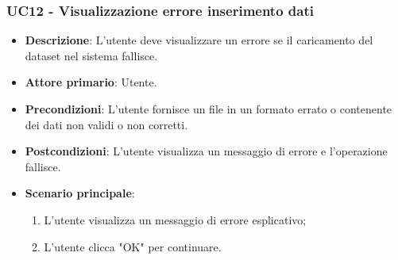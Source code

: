 \subsubsection{UC12 - Visualizzazione errore inserimento dati}
\begin{itemize}
	\item \textbf{Descrizione}: L'utente deve visualizzare un errore se il caricamento del dataset nel sistema fallisce.
	\item \textbf{Attore primario}: Utente.
	\item \textbf{Precondizioni}: L'utente fornisce un file in un formato errato o contenente dei dati non validi o non corretti.
	\item \textbf{Postcondizioni}: L'utente visualizza un messaggio di errore e l'operazione fallisce.
	\item \textbf{Scenario principale}:
		\begin{enumerate}
			\item L'utente visualizza un messaggio di errore esplicativo;
			\item L'utente clicca "OK" per continuare.
		\end{enumerate}
\end{itemize}